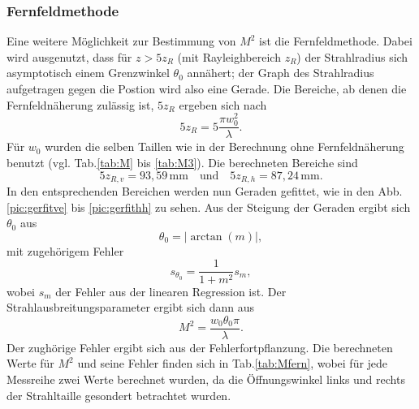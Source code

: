 \subsubsection*{Fernfeldmethode}
Eine weitere Möglichkeit zur Bestimmung von $M^2$ ist die Fernfeldmethode. Dabei wird ausgenutzt, dass für $z>5z_R$ (mit Rayleighbereich $z_R$) der Strahlradius sich asymptotisch 
einem Grenzwinkel $\theta_0$ annähert; der Graph des Strahlradius aufgetragen gegen die Postion wird also eine Gerade. 
Die Bereiche, ab denen die Fernfeldnäherung zulässig ist, $5z_R$ ergeben sich nach 
\begin{equation*}
    5z_R = 5 \frac{\pi w_0^2}{\lambda}.
\end{equation*}
Für $w_0$ wurden die selben Taillen wie in der Berechnung ohne Fernfeldnäherung benutzt (vgl. Tab.\ref{tab:M} bis \ref{tab:M3}). Die berechneten Bereiche sind  
\begin{equation*}
    5z_{R,v} = 93,59\,\mathrm{mm} \quad \mathrm{ und } \quad 5z_{R,h} = 87,24\,\mathrm{mm}.
\end{equation*}
In den entsprechenden Bereichen werden nun Geraden gefittet, wie in den Abb.\ref{pic:gerfitve} bis \ref{pic:gerfithh} zu sehen. Aus der Steigung der Geraden ergibt sich $\theta_0$ 
aus 
\begin{equation*}
    \theta_0 = |\arctan(m)|,
\end{equation*}
mit zugehörigem Fehler
\begin{equation*}
    s_{\theta_0} = \frac{1}{1+m^2}s_m,
\end{equation*}
wobei $s_m$ der Fehler aus der linearen Regression ist.
Der Strahlausbreitungsparameter ergibt sich dann aus
\begin{equation*}
    M^2 = \frac{w_0\theta_0 \pi }{\lambda}.
\end{equation*}
Der zughörige Fehler ergibt sich aus der Fehlerfortpflanzung. Die berechneten Werte für $M^2$ und seine Fehler finden sich in Tab.\ref{tab:Mfern}, wobei für jede Messreihe 
zwei Werte berechnet wurden, da die Öffnungswinkel links und rechts der Strahltaille gesondert betrachtet wurden. %
